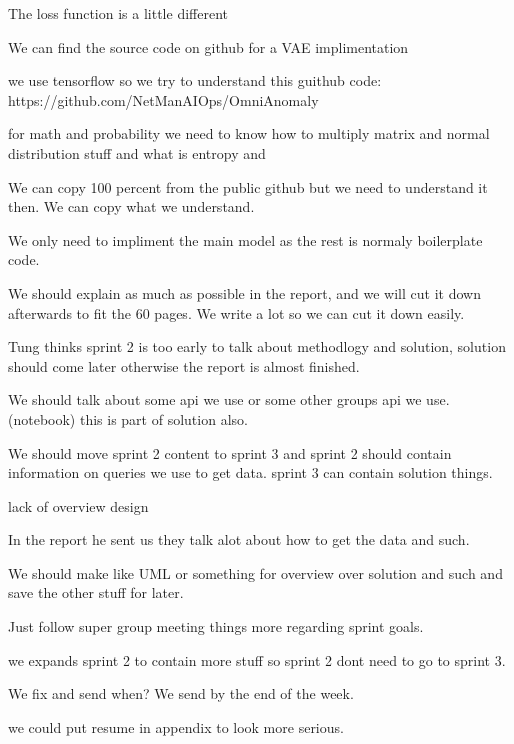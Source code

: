 The loss function is a little different

We can find the source code on github for a VAE implimentation

we use tensorflow so we try to understand this guithub code: https://github.com/NetManAIOps/OmniAnomaly

for math and probability we need to know how to multiply matrix and normal distribution stuff and what is entropy and

We can copy 100 percent from the public github but we need to understand it then. We can copy what we understand.

We only need to impliment the main model as the rest is normaly boilerplate code.

We should explain as much as possible in the report, and we will cut it down afterwards to fit the 60 pages. We write a lot so we can cut it down easily.

Tung thinks sprint 2 is too early to talk about methodlogy and solution, solution should come later otherwise the report is almost finished.

We should talk about some api we use or some other groups api we use. (notebook) this is part of solution also.

We should move sprint 2 content to sprint 3 and sprint 2 should contain information on queries we use to get data.
sprint 3 can contain solution things.

lack of overview design

In the report he sent us they talk alot about how to get the data and such.

We should make like UML or something for overview over solution and such and save the other stuff for later.

Just follow super group meeting things more regarding sprint goals.

we expands sprint 2 to contain more stuff so sprint 2 dont need to go to sprint 3.

We fix and send when?
We send by the end of the week.

we could put resume in appendix to look more serious. 